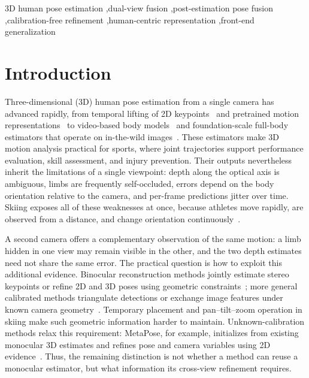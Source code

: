 \documentclass[preprint,12pt]{elsarticle}
\begin{document}
\begin{frontmatter}
\begin{keyword}
3D human pose estimation \sep dual-view fusion \sep post-estimation pose fusion \sep calibration-free refinement \sep human-centric representation \sep front-end generalization
\end{keyword}

\end{frontmatter}

\linenumbers

\section{Introduction}

Three-dimensional (3D) human pose estimation from a single camera has advanced rapidly, from temporal lifting of 2D keypoints~\cite{pavllo2019videopose3d,zheng2021poseformer,li2022mhformer} and pretrained motion representations~\cite{zhu2023motionbert} to video-based body models~\cite{kocabas2020vibe} and foundation-scale full-body estimators that operate on in-the-wild images~\cite{yang2026sam}. These estimators make 3D motion analysis practical for sports, where joint trajectories support performance evaluation, skill assessment, and injury prevention. Their outputs nevertheless inherit the limitations of a single viewpoint: depth along the optical axis is ambiguous, limbs are frequently self-occluded, errors depend on the body orientation relative to the camera, and per-frame predictions jitter over time. Skiing exposes all of these weaknesses at once, because athletes move rapidly, are observed from a distance, and change orientation continuously~\cite{rhodin2018learning,chen2021sportscap}.

A second camera offers a complementary observation of the same motion: a limb hidden in one view may remain visible in the other, and the two depth estimates need not share the same error. The practical question is how to exploit this additional evidence. Binocular reconstruction methods jointly estimate stereo keypoints or refine 2D and 3D poses using geometric constraints~\cite{wan2025rsb,wan2024dualdiffusion}; more general calibrated methods triangulate detections or exchange image features under known camera geometry~\cite{iskakov2019learnable,he2020epipolar,liao2024multiple,zhang2021adafuse}. Temporary placement and pan--tilt--zoom operation in skiing make such geometric information harder to maintain. Unknown-calibration methods relax this requirement: MetaPose, for example, initializes from existing monocular 3D estimates and refines pose and camera variables using 2D evidence~\cite{usman2022metapose}. Thus, the remaining distinction is not whether a method can reuse a monocular estimator, but what information its cross-view refinement requires.
\end{document}
